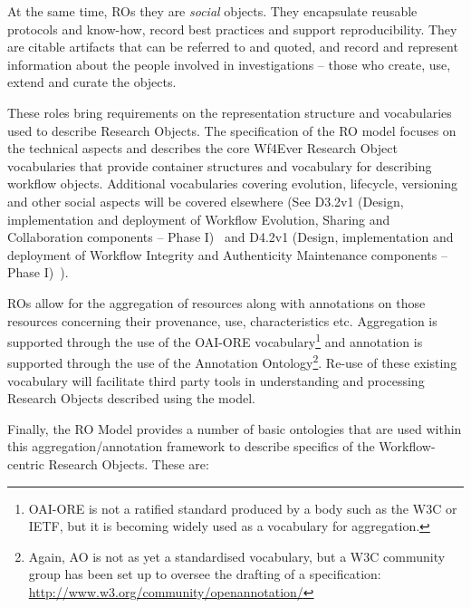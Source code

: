 At the same time, ROs they are \emph{social} objects. They encapsulate reusable protocols and know-how, record best practices and support reproducibility. They are citable artifacts that can be referred to and quoted, and record and represent information about the people involved in investigations -- those who create, use, extend and curate the objects.

These roles bring requirements on the representation structure and vocabularies used to describe Research Objects. The specification of the RO model focuses on the technical aspects and describes the core Wf4Ever Research Object vocabularies that provide container structures and vocabulary for describing workflow objects. Additional vocabularies covering evolution, lifecycle, versioning and other social aspects will be covered elsewhere (See D3.2v1 (Design, implementation and deployment of Workflow Evolution, Sharing and Collaboration components -- Phase I)~\cite{D3.2v1} and 
D4.2v1 (Design, implementation and deployment of Workflow Integrity and Authenticity Maintenance components -- Phase I)~\cite{D4.2v1}). 


ROs allow for the aggregation of resources along with annotations on
those resources concerning their provenance, use, characteristics
etc. Aggregation is supported through the use of the OAI-ORE
vocabulary\footnote{OAI-ORE is not a ratified standard
  produced by a body such as the W3C or IETF, but it is becoming
  widely used as a vocabulary for aggregation.} and annotation is
supported through the use of the Annotation Ontology\footnote{Again,
  AO is not as yet a standardised vocabulary, but a W3C community
  group has been set up to oversee the drafting of a specification: \url{http://www.w3.org/community/openannotation/}}. Re-use of these existing vocabulary will facilitate third party tools in understanding and processing Research Objects described using the model. 


Finally, the RO Model provides a number of basic ontologies that are used within this aggregation/annotation framework to describe specifics of the Workflow-centric Research Objects. These are:

